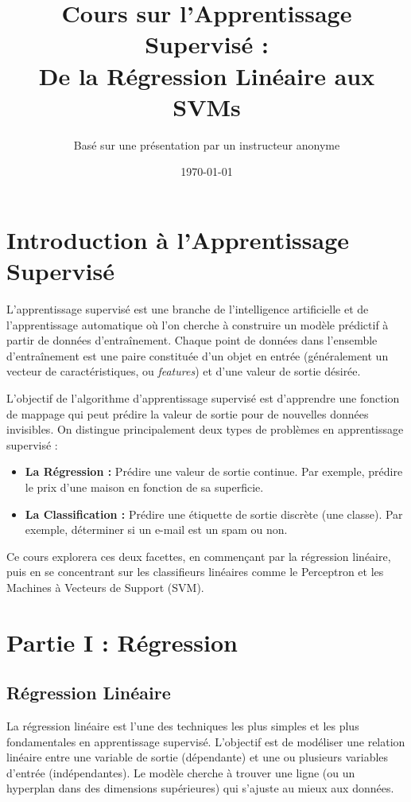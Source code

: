 \documentclass[12pt]{article}
\title{\textbf{Cours sur l'Apprentissage Supervisé :\\ De la Régression Linéaire aux SVMs}}
\author{Basé sur une présentation par un instructeur anonyme}
\date{\today}
\begin{document}
\maketitle
\thispagestyle{empty}

\newpage
\tableofcontents
\thispagestyle{empty}

\newpage
\section{Introduction à l'Apprentissage Supervisé}
L'apprentissage supervisé est une branche de l'intelligence artificielle et de l'apprentissage automatique où l'on cherche à construire un modèle prédictif à partir de données d'entraînement. Chaque point de données dans l'ensemble d'entraînement est une paire constituée d'un objet en entrée (généralement un vecteur de caractéristiques, ou \textit{features}) et d'une valeur de sortie désirée.

L'objectif de l'algorithme d'apprentissage supervisé est d'apprendre une fonction de mappage qui peut prédire la valeur de sortie pour de nouvelles données invisibles. On distingue principalement deux types de problèmes en apprentissage supervisé :
\begin{itemize}
    \item \textbf{La Régression :} Prédire une valeur de sortie continue. Par exemple, prédire le prix d'une maison en fonction de sa superficie.
    \item \textbf{La Classification :} Prédire une étiquette de sortie discrète (une classe). Par exemple, déterminer si un e-mail est un spam ou non.
\end{itemize}
Ce cours explorera ces deux facettes, en commençant par la régression linéaire, puis en se concentrant sur les classifieurs linéaires comme le Perceptron et les Machines à Vecteurs de Support (SVM).

\section{Partie I : Régression}

\subsection{Régression Linéaire}
La régression linéaire est l'une des techniques les plus simples et les plus fondamentales en apprentissage supervisé. L'objectif est de modéliser une relation linéaire entre une variable de sortie (dépendante) et une ou plusieurs variables d'entrée (indépendantes). Le modèle cherche à trouver une ligne (ou un hyperplan dans des dimensions supérieures) qui s'ajuste au mieux aux données.
\end{document}
